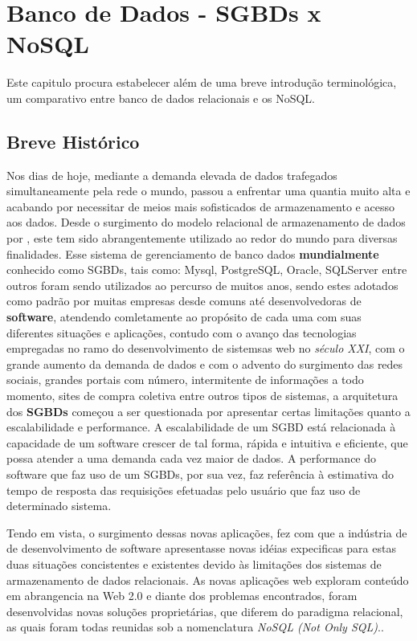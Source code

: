 \chapter{Banco de Dados - SGBDs x NoSQL}
\thispagestyle{empty}
Este capitulo procura estabelecer além de uma breve introdução terminológica, um comparativo entre banco de dados relacionais e os NoSQL.

\section{Breve Histórico}
Nos dias de hoje, mediante a demanda elevada de dados trafegados simultaneamente pela rede o mundo, passou a enfrentar uma quantia muito alta e acabando por necessitar de meios 
mais sofisticados de armazenamento e acesso aos dados. Desde o surgimento do modelo relacional de armazenamento de dados por \cite{CODD}, este tem sido 
abrangentemente utilizado ao redor do mundo para diversas finalidades. Esse sistema de gerenciamento de banco dados \textbf{mundialmente} conhecido como SGBDs, tais como:
Mysql, PostgreSQL, Oracle, SQLServer entre outros foram sendo utilizados ao percurso de muitos anos, sendo estes adotados como padrão por muitas empresas desde comuns até
desenvolvedoras de \textbf{software}, atendendo comletamente ao propósito de cada uma com suas diferentes situações e aplicações, contudo com o avanço das tecnologias 
empregadas no ramo do desenvolvimento de sistemsas web no \textit{século XXI}, com o grande aumento da demanda de dados e com o advento do surgimento das redes sociais, grandes portais com número, intermitente de
informações a todo momento, sites de compra coletiva entre outros tipos de sistemas, a arquitetura dos \textbf{SGBDs} começou a ser questionada por apresentar 
certas limitações quanto a escalabilidade e performance. A escalabilidade de um SGBD está relacionada à capacidade de um software crescer de tal forma, rápida
e intuitiva e eficiente, que possa atender a uma demanda cada vez maior de dados. A performance do software que faz uso de um SGBDs, por sua vez, faz referência
à estimativa do tempo de resposta das requisições efetuadas pelo usuário que faz uso de determinado sistema.

Tendo em vista, o surgimento dessas novas aplicações, fez com que a indústria de de desenvolvimento de software apresentasse novas idéias expecificas para estas
duas situações concistentes e existentes devido às limitações dos sistemas de armazenamento de dados relacionais. As novas aplicações web exploram conteúdo em 
abrangencia na Web 2.0 e diante dos problemas encontrados, foram desenvolvidas novas soluções proprietárias, que diferem do paradigma relacional, 
as quais foram todas reunidas sob a nomenclatura \textit{NoSQL (Not Only SQL)}.\cite{CUNHA}.

